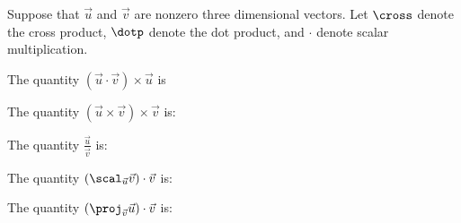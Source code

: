 \documentclass{ximera}
\author{Jim Talamo}
\begin{document}
\begin{exercise}
Suppose that $\vec u $ and $\vec v $ are nonzero three dimensional vectors.  Let $\cross$ denote the cross product, $\dotp$ denote the dot product, and $\cdot$ denote scalar multiplication.

The quantity $(\vec u \cdot \vec v) \times \vec u$ is

\begin{multipleChoice}
\end{multipleChoice}



The quantity $(\vec u \times \vec v)\times \vec v$ is:

\begin{multipleChoice}
\end{multipleChoice}

The quantity $\frac {\vec u} {\vec v}$ is:

\begin{multipleChoice}
\end{multipleChoice}

The quantity $(\scal_{\vec u} \vec v) \cdot \vec{v}$ is:
\begin{multipleChoice}
\end{multipleChoice}

The quantity $(\proj_{\vec v} \vec u)\cdot \vec v$ is:

\begin{multipleChoice}
\end{multipleChoice}



\end{exercise}
\end{document}
